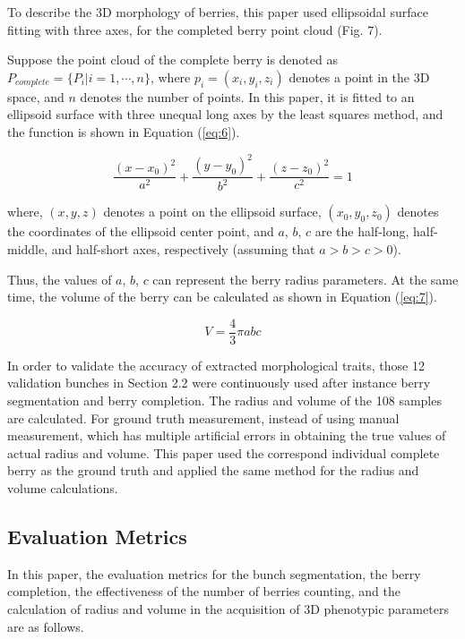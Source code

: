\documentclass[12pt]{article}
\begin{document}
To describe the 3D morphology of berries, this paper used ellipsoidal surface fitting with three axes, for the completed berry point cloud (Fig. 7).


Suppose the point cloud of the complete berry is denoted as $P_{complete}=\{P_i | i=1, \cdots,n\}$, where $p_i=(x_i,y_i,z_i)$ denotes a point in the 3D space, and $n$ denotes the number of points. 
In this paper, it is fitted to an ellipsoid surface with three unequal long axes by the least squares method, and the function is shown in Equation (\ref{eq:6}).

\begin{equation}
    \frac{(x-x_0)^2}{a^2} + \frac{(y-y_0)^2}{b^2} + \frac{(z-z_0)^2}{c^2} = 1
    \label{eq:6}
\end{equation}

{\raggedright where, $(x,y,z)$ denotes a point on the ellipsoid surface, $(x_0,y_0,z_0)$ denotes the coordinates of the ellipsoid center point, and $a$, $b$, $c$ are the half-long, half-middle, and half-short axes, respectively (assuming that $a>b>c>0$). }

Thus, the values of $a$, $b$, $c$ can represent the berry radius parameters. 
At the same time, the volume of the berry can be calculated as shown in Equation (\ref{eq:7}).

\begin{equation}
    V=\frac{4}{3} \pi a b c
    \label{eq:7}
\end{equation}

In order to validate the accuracy of extracted morphological traits, those 12 validation bunches in %
Section 2.2 were continuously used after instance berry segmentation and berry completion. 
The radius and volume of the 108 samples are calculated. 
For ground truth measurement, instead of using manual measurement, which has multiple artificial errors in obtaining the true values of actual radius and volume. 
This paper used the correspond individual complete berry as the ground truth and applied the same method for the radius and volume calculations. 

\subsection{Evaluation Metrics}

In this paper, the evaluation metrics for the bunch segmentation, the berry completion, the effectiveness of the number of berries counting, and the calculation of radius and volume in the acquisition of 3D phenotypic parameters are as follows.
\end{document}
